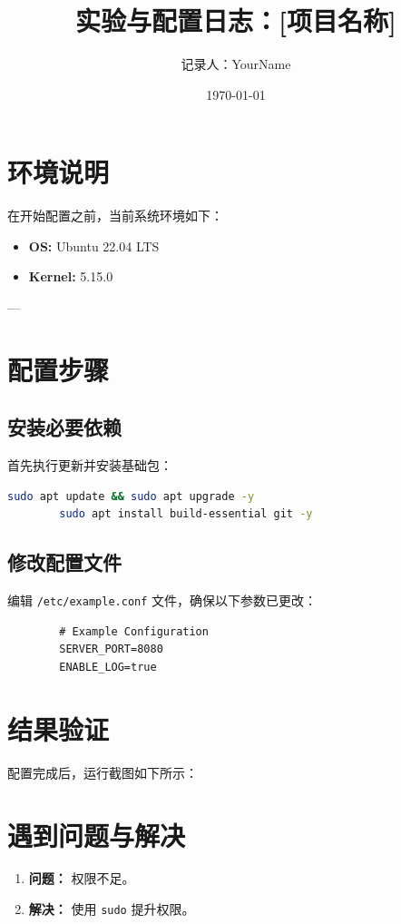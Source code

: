 \documentclass[11pt, a4paper]{article}
\title{\textbf{实验与配置日志：[项目名称]}}
\author{记录人：YourName}
\date{\today}
\begin{document}
	
	\maketitle
	
	\section{环境说明}
	在开始配置之前，当前系统环境如下：
	\begin{itemize}
		\item \textbf{OS:} Ubuntu 22.04 LTS
		\item \textbf{Kernel:} 5.15.0
	\end{itemize}
	
	---
	
	\section{配置步骤}
	
	\subsection{安装必要依赖}
	首先执行更新并安装基础包：
	
	\begin{lstlisting}[language=bash]
		sudo apt update && sudo apt upgrade -y
		sudo apt install build-essential git -y
	\end{lstlisting}
	
	\subsection{修改配置文件}
	编辑 \texttt{/etc/example.conf} 文件，确保以下参数已更改：
	
	\begin{lstlisting}
		# Example Configuration
		SERVER_PORT=8080
		ENABLE_LOG=true
	\end{lstlisting}
	
	\section{结果验证}
	配置完成后，运行截图如下所示：
	
	
	\section{遇到问题与解决}
	\begin{enumerate}
		\item \textbf{问题：} 权限不足。
		\item \textbf{解决：} 使用 \texttt{sudo} 提升权限。
	\end{enumerate}
	
\end{document}
